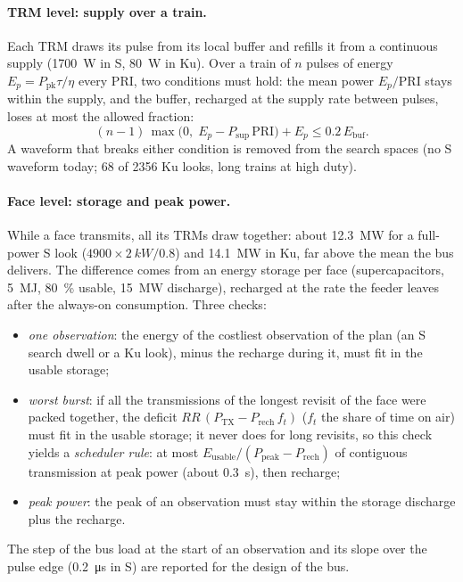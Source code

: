 \documentclass[11pt,a4paper]{article}
\begin{document}
\paragraph{TRM level: supply over a train.} Each TRM draws its pulse from its local buffer and refills it from a
continuous supply (\SI{1700}{W} in S, \SI{80}{W} in Ku). Over a train of $n$ pulses of energy
$E_p = P_{\mathrm{pk}}\tau/\eta$ every PRI, two conditions must hold: the mean power $E_p/\mathrm{PRI}$ stays within the
supply, and the buffer, recharged at the supply rate between pulses, loses at most the allowed fraction:
\[
  (n-1)\,\max\bigl(0,\;E_p - P_{\mathrm{sup}}\,\mathrm{PRI}\bigr) + E_p \le 0.2\,E_{\mathrm{buf}}.
\]
A waveform that breaks either condition is removed from the search spaces (no S waveform today; 68 of \num{2356} Ku
looks, long trains at high duty).

\paragraph{Face level: storage and peak power.} While a face transmits, all its TRMs draw together: about
\SI{12.3}{MW} for a full-power S look ($\num{4900}\times\SI{2}{kW}/0.8$) and \SI{14.1}{MW} in Ku, far above the mean
the bus delivers. The difference comes from an energy storage per face (supercapacitors, \SI{5}{MJ}, \SI{80}{\percent}
usable, \SI{15}{MW} discharge), recharged at the rate the feeder leaves after the always-on consumption. Three checks:
\begin{itemize}
  \item \emph{one observation}: the energy of the costliest observation of the plan (an S search dwell or a Ku look),
        minus the recharge during it, must fit in the usable storage;
  \item \emph{worst burst}: if all the transmissions of the longest revisit of the face were packed together, the
        deficit $RR\,(P_{\mathrm{TX}} - P_{\mathrm{rech}}\,f_t)$ ($f_t$ the share of time on air) must fit in the usable
        storage; it never does for long revisits, so this check yields a \emph{scheduler rule}: at most
        $E_{\mathrm{usable}}/(P_{\mathrm{peak}} - P_{\mathrm{rech}})$ of contiguous transmission at peak power (about
        \SI{0.3}{s}), then recharge;
  \item \emph{peak power}: the peak of an observation must stay within the storage discharge plus the recharge.
\end{itemize}
The step of the bus load at the start of an observation and its slope over the pulse edge (\SI{0.2}{\micro s} in S)
are reported for the design of the bus.
\end{document}
